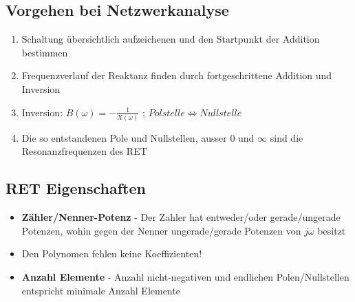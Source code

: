 \begin{multicols}{2}
	
\subsection{Vorgehen bei Netzwerkanalyse}
	\begin{enumerate}{\setlength{\itemsep}{0cm}\setlength{\parsep}{0cm} \setlength{\topsep}{0cm}}
      \item Schaltung übersichtlich aufzeichenen und den Startpunkt der Addition bestimmen
      \item Frequenzverlauf der Reaktanz finden durch fortgeschrittene Addition und Inversion
      \item Inversion: $B(\omega)=-\frac{1}{X(\omega)}$ ; $Polstelle \Longleftrightarrow Nullstelle$
      \item Die so entstandenen Pole und Nullstellen, ausser 0 und $\infty$ sind die Resonanzfrequenzen des RET
    \end{enumerate}
    
    
\subsection{RET Eigenschaften}
	\begin{itemize}
		\item \textbf{Zähler/Nenner-Potenz} - Der Zahler hat entweder/oder gerade/ungerade Potenzen, wohin gegen der Nenner ungerade/gerade Potenzen von $j\omega$ besitzt
		\item Den Polynomen fehlen keine Koeffizienten!
		\item \textbf{Anzahl Elemente} - Anzahl nicht-negativen und endlichen Polen/Nullstellen entspricht minimale Anzahl Elemente
	\end{itemize}
	
\end{multicols}	

